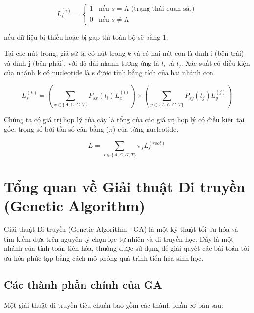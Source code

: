 \documentclass[12pt,a4paper]{report}
\begin{document}
\begin{equation}
    L_s^{(i)} = 
    \begin{cases} 
        1 & \text{nếu } s = \text{A (trạng thái quan sát)} \\
        0 & \text{nếu } s \neq \text{A}
    \end{cases}
\end{equation}

nếu dữ liệu bị thiếu hoặc bị gap thì toàn bộ sẽ bằng 1.

Tại các nút trong, giả sử ta có nút trong \(k\) và có hai nút con là đỉnh i (bên trái) và đỉnh j (bên phải), với độ dài nhanh tương ứng là \(l_i\) và \(l_j\). Xác suất có điều kiện của nhánh k có nucleotide là s được tính bằng tích của hai nhánh con.

\begin{equation}
    L_s^{(k)} = \left( \sum_{x \in \{A,C,G,T\}} P_{sx}(t_i) L_x^{(i)} \right) \times \left( \sum_{y \in \{A,C,G,T\}} P_{sy}(t_j) L_y^{(j)} \right)
    \label{eq:felsenstein_recursion}
\end{equation}

Chúng ta có giá trị hợp lý của cây là tổng của các giá trị hợp lý có điều kiện tại gốc, trọng số bởi tần số cân bằng ($\pi$) của từng nucleotide.


\begin{equation}
    L = \sum_{s \in \{A,C,G,T\}} \pi_s L_s^{(root)}
\end{equation}



\section{Tổng quan về Giải thuật Di truyền (Genetic Algorithm)}


Giải thuật Di truyền (Genetic Algorithm - GA) là một kỹ thuật tối ưu hóa và tìm kiếm dựa trên nguyên lý chọn lọc tự nhiên và di truyền học. Đây là một nhánh của tính toán tiến hóa, thường được sử dụng để giải quyết các bài toán tối ưu hóa phức tạp bằng cách mô phỏng quá trình tiến hóa sinh học.

\subsection{Các thành phần chính của GA}
Một giải thuật di truyền tiêu chuẩn bao gồm các thành phần cơ bản sau:
\end{document}
